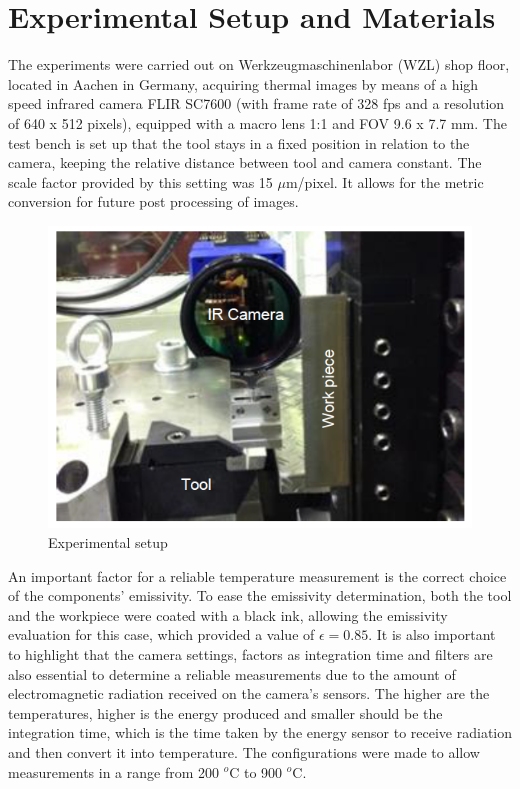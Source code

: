 	\section{Experimental Setup and Materials}
	\label{sec:exSetup}

		The experiments were carried out on Werkzeugmaschinenlabor (WZL) shop floor, located in Aachen in Germany, acquiring thermal images by means of a high speed infrared camera FLIR SC7600 (with frame rate of 328 fps and a resolution of 640 x 512 pixels), equipped with a macro lens 1:1 and FOV 9.6 x 7.7 mm. The test bench is set up that the tool stays in a fixed position in relation to the camera, keeping the relative distance between tool and camera constant. The scale factor provided by this setting was 15 $\mu$m/pixel. It allows for the metric conversion for future post processing of images.

		\begin{figure}[H]
			\centering
			\captionsetup{justification=centering}
			\includegraphics[scale = 0.5]{Cap3/exsetup.png}
			\caption{Experimental setup \cite{augspurger2016experimental}}
			\label{fig:exinfrared}
		\end{figure}

		An important factor for a reliable temperature measurement is the correct choice of the components' emissivity. To ease the emissivity determination, both the tool and the workpiece were coated with a black ink, allowing the emissivity evaluation for this case, which provided a value of $\epsilon = 0.85$. It is also important to highlight that the camera settings, factors as integration time and filters are also essential to determine a reliable measurements due to the amount of electromagnetic radiation received on the camera's sensors. The higher are the temperatures, higher is the energy produced and smaller should be the integration time, which is the time taken by the energy sensor to receive radiation and then convert it into temperature. The configurations were made to allow measurements in a range from 200 $^{o}$C to 900 $^{o}$C.
	
